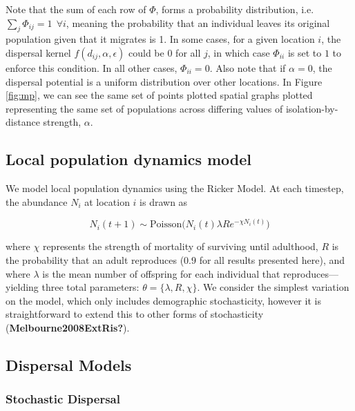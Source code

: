 \documentclass[11pt]{article}
\begin{document}
Note that the sum of each row of \(\Phi\), forms a probability
distribution, i.e. \(\sum_j \Phi_{ij} = 1 \ \ \forall i\), meaning the
probability that an individual leaves its original population given that
it migrates is 1. In some cases, for a given location \(i\), the
dispersal kernel \(f(d_{ij}, \alpha, \epsilon)\) could be \(0\) for all
\(j\), in which case \(\Phi_{ii}\) is set to \(1\) to enforce this
condition. In all other cases, \(\Phi_{ii}=0\). Also note that if
\(\alpha=0\), the dispersal potential is a uniform distribution over
other locations. In Figure \ref{fig:mp}, we can see the same set of
points plotted spatial graphs plotted representing the same set of
populations across differing values of isolation-by-distance strength,
\(\alpha\).

\hypertarget{local-population-dynamics-model}{%
\subsection{Local population dynamics
model}\label{local-population-dynamics-model}}

We model local population dynamics using the Ricker Model. At each
timestep, the abundance \(N_i\) at location \(i\) is drawn as

\[N_i(t+1) \sim \text{Poisson}\bigg(N_i(t) \lambda R e^{- \chi N_i(t)}\bigg)\]

where \(\chi\) represents the strength of mortality of surviving until
adulthood, \(R\) is the probability that an adult reproduces (\(0.9\)
for all results presented here), and where \(\lambda\) is the mean
number of offspring for each individual that reproduces---yielding three
total parameters: \(\theta = \{\lambda, R, \chi \}\). We consider the
simplest variation on the model, which only includes demographic
stochasticity, however it is straightforward to extend this to other
forms of stochasticity (\textbf{Melbourne2008ExtRis?}).

\hypertarget{dispersal-models}{%
\subsection{Dispersal Models}\label{dispersal-models}}

\hypertarget{stochastic-dispersal}{%
\subsubsection{Stochastic Dispersal}\label{stochastic-dispersal}}
\end{document}
